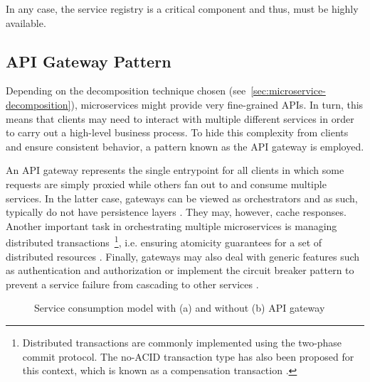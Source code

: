 In any case, the service registry is a critical component and thus, must be highly available.


\subsection{\acs{API} Gateway Pattern}
\label{sec:api-gateway-pattern}

Depending on the decomposition technique chosen (see~\autoref{sec:microservice-decomposition}), microservices might provide very fine-grained \acsp{API}. In turn, this means that clients may need to interact with multiple different services in order to carry out a high-level business process. To hide this complexity from clients and ensure consistent behavior, a pattern known as the \acs{API} gateway is employed.

An \acs{API} gateway represents the single entrypoint for all clients in which some requests are simply proxied while others fan out to and consume multiple services. In the latter case, gateways can be viewed as orchestrators and as such, typically do not have persistence layers \cite[p.~585]{villamizar2015evaluating}. They may, however, cache responses. Another important task in orchestrating multiple microservices is managing distributed transactions~\footnote{Distributed transactions are commonly implemented using the two-phase commit protocol. The no-\acs{ACID} transaction type has also been proposed for this context, which is known as a compensation transaction \cite[p.~32]{cerny2018contextual}.}, i.e. ensuring atomicity guarantees for a set of distributed resources \cite[p.~32]{cerny2018contextual}. Finally, gateways may also deal with generic features such as authentication and authorization or implement the circuit breaker pattern to prevent a service failure from cascading to other services \cite[p.~41]{kalske2017challenges} \cite[p.~37]{messina2016simplified}.

\begin{figure}[htp]
    \centering
    \qquad

    \caption[Service consumption model with and without \acs{API} gateway]{Service consumption model with (a) and without (b) \acs{API} gateway \cite{netflix2013api}}
    \label{fig:api-gateway-pattern}
\end{figure}


